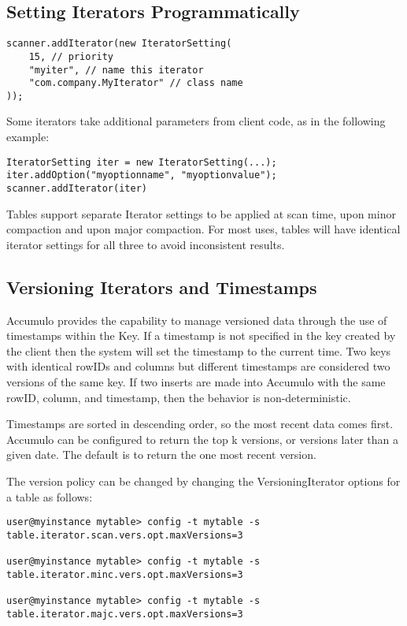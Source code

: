 \subsection{Setting Iterators Programmatically}

\begingroup\fontsize{8pt}{8pt}\selectfont\begin{verbatim}
scanner.addIterator(new IteratorSetting(
    15, // priority
    "myiter", // name this iterator
    "com.company.MyIterator" // class name
));
\end{verbatim}\endgroup

Some iterators take additional parameters from client code, as in the following
example:

\begingroup\fontsize{8pt}{8pt}\selectfont\begin{verbatim}
IteratorSetting iter = new IteratorSetting(...);
iter.addOption("myoptionname", "myoptionvalue");
scanner.addIterator(iter)
\end{verbatim}\endgroup

Tables support separate Iterator settings to be applied at scan time, upon minor
compaction and upon major compaction. For most uses, tables will have identical
iterator settings for all three to avoid inconsistent results.

\subsection{Versioning Iterators and Timestamps}

Accumulo provides the capability to manage versioned data through the use of
timestamps within the Key. If a timestamp is not specified in the key created by the
client then the system will set the timestamp to the current time. Two keys with
identical rowIDs and columns but different timestamps are considered two versions
of the same key. If two inserts are made into Accumulo with the same rowID,
column, and timestamp, then the behavior is non-deterministic.

Timestamps are sorted in descending order, so the most recent data comes first.
Accumulo can be configured to return the top k versions, or versions later than a
given date. The default is to return the one most recent version.

The version policy can be changed by changing the VersioningIterator options for a
table as follows:

\begingroup\fontsize{8pt}{8pt}\selectfont\begin{verbatim}
user@myinstance mytable> config -t mytable -s table.iterator.scan.vers.opt.maxVersions=3

user@myinstance mytable> config -t mytable -s table.iterator.minc.vers.opt.maxVersions=3

user@myinstance mytable> config -t mytable -s table.iterator.majc.vers.opt.maxVersions=3
\end{verbatim}\endgroup

